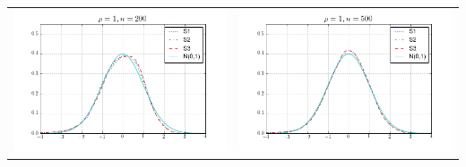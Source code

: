 \begin{table}[!ht]
{\begin{tabular}{c c}
\includegraphics[width=8cm]{theta_t_ratio_200_1} & \includegraphics[width=8cm]{theta_t_ratio_500_1} \\
\end{tabular}
}
\end{table}



